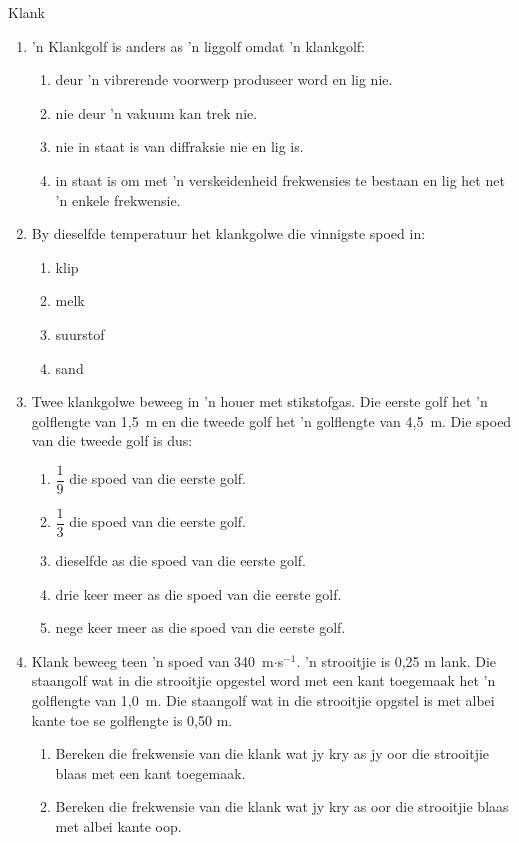 \begin{eocexercises}{Klank}
\begin{enumerate}[noitemsep, label=\textbf{\arabic*}. ]
\item  'n Klankgolf is anders as  'n liggolf omdat  'n klankgolf:
\begin{enumerate}[noitemsep, label=\textbf{\alph*}. ] 
    \item deur  'n vibrerende voorwerp produseer word en lig nie.
    \item nie deur  'n vakuum kan trek nie.
    \item nie in staat is van diffraksie nie en lig is.
    \item in staat is om met  'n verskeidenheid frekwensies te bestaan en lig het net  'n enkele frekwensie. 
\end{enumerate}

\item By dieselfde temperatuur het klankgolwe die vinnigste spoed in:
\begin{enumerate}[noitemsep, label=\textbf{\alph*}. ] 
    \item klip
    \item melk
    \item suurstof
    \item sand
\end{enumerate}
                
\item Twee klankgolwe beweeg in  'n houer met stikstofgas. Die eerste golf het  'n golflengte van 1,5~m en die tweede golf het  'n golflengte van 4,5~m. Die spoed van die tweede golf is dus:
\begin{enumerate}[itemsep=5pt, label=\textbf{\alph*}. ] 
    \item $\dfrac{1}{9}$ die spoed van die eerste golf.
    \item $\dfrac{1}{3}$ die spoed van die eerste golf.
    \item dieselfde as die spoed van die eerste golf.
    \item drie keer meer as die spoed van die eerste golf.
    \item nege keer meer as die spoed van die eerste golf.
\end{enumerate}


\item Klank beweeg teen  'n spoed van 340~m$\ensuremath{\cdot}$s${}^{-1}$.  'n strooitjie is 0,25 m lank. Die staangolf wat in die strooitjie opgestel word met een kant toegemaak het  'n golflengte van 1,0~m. Die staangolf wat in die strooitjie opgstel is met albei kante toe se golflengte is 0,50 m.
\begin{enumerate}[noitemsep, label=\textbf{\alph*}. ] 
    \item Bereken die frekwensie van die klank wat jy kry as jy oor die strooitjie blaas met een kant toegemaak.
    \item Bereken die frekwensie van die klank wat jy kry as oor die strooitjie blaas met albei kante oop.
\end{enumerate}


\end{enumerate}
\end{eocexercises}
